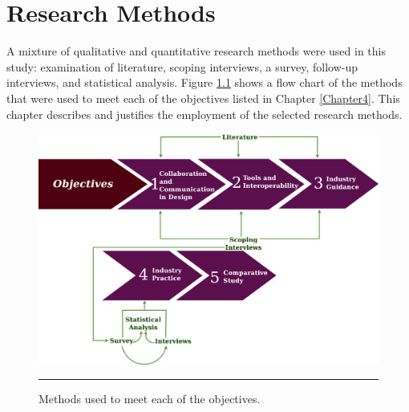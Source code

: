\chapter{Research Methods} %

\label{Chapter5} %


A mixture of qualitative and quantitative research methods were used in this study: examination of literature, scoping interviews, a survey, follow-up interviews, and statistical analysis.
Figure \ref{fig_methodology} shows a flow chart of the methods that were used to meet each of the objectives listed in Chapter \ref{Chapter4}.
This chapter describes and justifies the employment of the selected research methods. %

\begin{figure}[htbp]
	\centering
	\includegraphics[width=\textwidth]{figures/Methodology03.eps}
	\rule{\textwidth}{0.5pt} %
	\caption[Methodology]{Methods used to meet each of the objectives.}
	\label{fig_methodology}
\end{figure}



